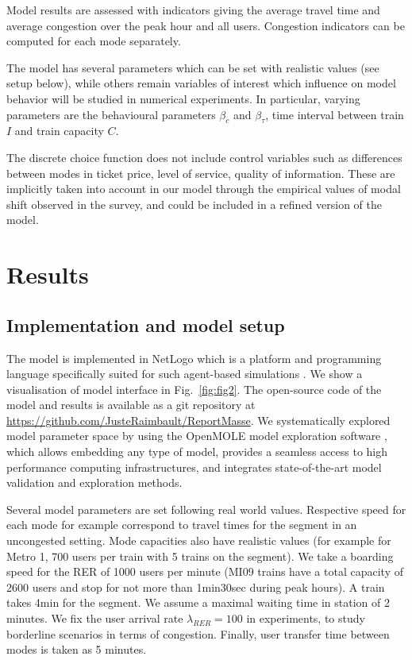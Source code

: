 \documentclass[10pt]{article}
\begin{document}
Model results are assessed with indicators giving the average travel time and average congestion over the peak hour and all users. Congestion indicators can be computed for each mode separately.

The model has several parameters which can be set with realistic values (see setup below), while others remain variables of interest which influence on model behavior will be studied in numerical experiments. In particular, varying parameters are the behavioural parameters $\beta_c$ and $\beta_{\tau}$, time interval between train $I$ and train capacity $C$.

The discrete choice function does not include control variables such as differences between modes in ticket price, level of service, quality of information. These are implicitly taken into account in our model through the empirical values of modal shift observed in the survey, and could be included in a refined version of the model.


\section{Results}



\subsection{Implementation and model setup}


The model is implemented in NetLogo which is a platform and programming language specifically suited for such agent-based simulations \citep{tisue2004netlogo}. We show a visualisation of model interface in Fig.~\ref{fig:fig2}. The open-source code of the model and results is available as a git repository at \url{https://github.com/JusteRaimbault/ReportMasse}. We systematically explored model parameter space by using the OpenMOLE model exploration software \citep{reuillon2013openmole}, which allows embedding any type of model, provides a seamless access to high performance computing infrastructures, and integrates state-of-the-art model validation and exploration methods.

Several model parameters are set following real world values. Respective speed for each mode for example correspond to travel times for the segment in an uncongested setting. Mode capacities also have realistic values (for example for Metro 1, 700 users per train with 5 trains on the segment). We take a boarding speed for the RER of 1000 users per minute (MI09 trains have a total capacity of 2600 users and stop for not more than 1min30sec during peak hours). A train takes 4min for the segment. We assume a maximal waiting time in station of 2 minutes. We fix the user arrival rate $\lambda_{RER} = 100$ in experiments, to study borderline scenarios in terms of congestion. Finally, user transfer time between modes is taken as 5 minutes.
\end{document}
